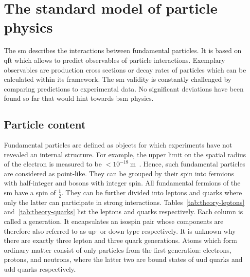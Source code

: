 \chapter{The standard model of particle physics}


The \gls{sm} describes the interactions between fundamental particles. It is based on \gls{qft} which allows to predict observables of particle interactions. Exemplary observables are production cross sections or decay rates of particles which can be calculated within its framework. The \gls{sm} validity is constantly challenged by comparing predictions to experimental data. No significant deviations have been found so far that would hint towards \gls{bsm} physics.


\section{Particle content}

Fundamental particles are defined as objects for which experiments have not revealed an internal structure. For example, the upper limit on the spatial radius of the electron is measured to be $<10^{-18}~\mathrm{m}$~\cite{PhysRevLett.97.030801}. Hence, such fundamental particles are considered as point-like. They can be grouped by their spin into fermions with half-integer and bosons with integer spin. All fundamental fermions of the \gls{sm} have a spin of $\frac{1}{2}$. They can be further divided into leptons and quarks where only the latter can participate in strong interactions. Tables~\ref{tab:theory-leptons} and~\ref{tab:theory-quarks} list the leptons and quarks respectively. Each column is called a generation. It encapsulates an isospin pair whose components are therefore also referred to as up- or down-type respectively. It is unknown why there are exactly three lepton and three quark generations. Atoms which form ordinary matter consist of only particles from the first generation: electrons, protons, and neutrons, where the latter two are bound states of uud quarks and udd quarks respectively.

